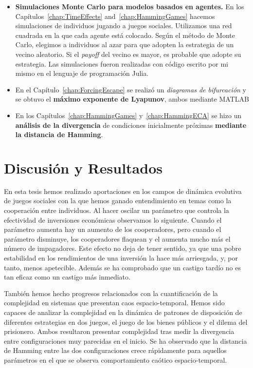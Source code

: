 \begin{itemize}


\item \textbf{Simulaciones Monte Carlo para modelos basados en agentes.} En los Capítulos~\ref{chap:TimeEffects} and~\ref{chap:HammingGames} hacemos simulaciones de individuos jugando a juegos sociales. Utilizamos una red cuadrada en la que cada agente está colocado. Según el método de Monte Carlo, elegimos a individuos al azar para que adopten la estrategia de un vecino aleatorio. Si el \textit{payoff} del vecino es mayor, es probable que adopte su estrategia. Las simulaciones fueron realizadas con código escrito por mi mismo en el lenguaje de programación Julia.

\item En el Capítulo~\ref{chap:ForcingEscape} se realizó un \textit{diagramas de bifurcación} y se obtuvo el \textbf{máximo exponente de Lyapunov}, ambos mediante MATLAB

\item En los Capítulos~\ref{chap:HammingGames} y~\ref{chap:HammingECA} se hizo un \textbf{análisis de la divergencia} de condiciones inicialmente próximas \textbf{mediante la distancia de Hamming}.

\end{itemize}

\section{Discusión y Resultados}

En esta tesis hemos realizado aportaciones en los campos de dinámica evolutiva de juegos sociales con la que hemos ganado entendimiento en temas como la cooperación entre individuos. Al hacer oscilar un parámetro que controla la efectividad de inversiones económicas observamos lo siguiente. Cuando el parámetro aumenta hay un aumento de los cooperadores, pero cuando el parámetro disminuye, los cooperadores flaquean y el aumenta mucho más el número de impagadores. Este efecto no deja de tener sentido, ya que una pobre estabilidad en los rendimientos de una inversión la hace más arriesgada, y, por tanto, menos apetecible. Además se ha comprobado que un castigo tardío no es tan eficaz como un castigo más inmediato.

También hemos hecho progresos relacionados con la cuantificación de la complejidad en sistemas que presentan caos espacio-temporal. Hemos sido capaces de analizar la complejidad en la dinámica de patrones de disposición de diferentes estrategias en dos juegos, el juego de los bienes públicos y el dilema del prisionero. Ambos resultaron presentar complejidad tras medir la divergencia entre configuraciones muy parecidas en el inicio. Se ha observado que la distancia de Hamming entre las dos configuraciones crece rápidamente para aquellos parámetros en el que se observa comportamiento caótico espacio-temporal.

